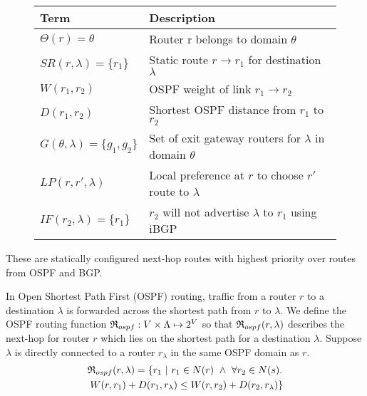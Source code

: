\begin{figure}
\vspace{-2mm}
\small
\begin{minipage}{\linewidth}
	\begin{tabular}{m{9em}  m{18em} } 
		{\bf Term} & {\bf Description} \\ 
		\hline
		$\Theta(r) = \theta$ & Router r belongs to domain $\theta$ \\ \hline
		$SR(r,\lambda)=\{r_1\}$ & Static route $r \rightarrow r_1$ for destination $\lambda$ \\ \hline
		$W(r_1, r_2)$ & OSPF weight of link $r_1 \rightarrow r_2$ \\ \hline
		$D(r_1, r_2)$ & Shortest OSPF distance from $r_1$ to $r_2$ \\ \hline
		$G(\theta, \lambda) = \{g_1, g_2\}$ & Set of exit gateway routers for $\lambda$ in domain $\theta$ \\ \hline
		$LP(r, r', \lambda)$ &  Local preference at $r$ to choose $r'$ route to $\lambda$ \\ \hline
		$IF(r_2, \lambda) = \{r_1\}$ & $r_2$ will not advertise $\lambda$ to $r_1$ using iBGP 
	\end{tabular}
	\end{minipage}
	\label{tab:policysupport}
\end{figure}


These are statically configured next-hop routes with highest 
priority over routes from OSPF and BGP.

 In Open Shortest Path First (OSPF) routing,
traffic from a router $r$ to a destination $\lambda$ is forwarded across 
the shortest path from $r$ to $\lambda$.
We define the OSPF routing function $\mathfrak{R}_{ospf}: 
V \times \Lambda \mapsto 2^V$ so that
$\mathfrak{R}_{ospf}(r,\lambda)$ describes the next-hop for
router $r$ which lies on the shortest path for a destination $\lambda$. 
Suppose $\lambda$ is directly connected to a router $r_\lambda$ 
in the same OSPF domain as $r$.
\begin{multline*}
\mathfrak{R}_{ospf}(r,\lambda) = \{r_1 ~|~ r_1 \in N(r)~\wedge~ \forall r_2 \in N(s). \\ ~W(r, r_1) + D(r_1, r_\lambda) \le 
W(r, r_2) + D(r_2, r_\lambda)\}
\end{multline*}

